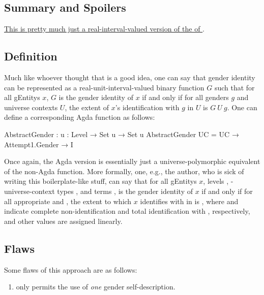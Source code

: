\documentclass{article}
\theoremstyle{remark}
\newcommand{\summaryLink}[2]{\hyperref[#1]{#2}}
\begin{document}
\subsection{Summary and Spoilers}
\summaryLink{sec:gender6definition}{This \AgdaFunction{AbstractGender} is pretty much just a real-interval-valued version of the \AgdaFunction{AbstractGender} of \fref{sec:gender5}}.

\subsection{Definition}\label{sec:gender6definition}
Much like whoever thought that  is a good idea, one can say that gender identity can be represented as a real-unit-interval-valued binary function \(G\) such that for all \glspl{gEntity} \(x\), \(G\) is the gender identity of \(x\) if and only if for all genders \(g\) and universe contexts \(U\), the extent of \(x\)'s identification with \(g\) in \(U\) is \(G\ U\ g\).  One can define a corresponding Agda function  as follows:

\begin{code}
  AbstractGender : {u : Level} → Set u → Set u
  AbstractGender UC = UC → Attempt1.Gender → I
\end{code}

Once again, the Agda version is essentially just a universe-polymorphic equivalent of the non-Agda function.  More formally, one, e.g., the author, who is sick of writing this boilerplate-like stuff, can say that for all \glspl{gEntity} \(x\), levels , -universe-context types , and   terms ,  is the gender identity of \(x\) if and only if for all appropriate  and , the extent to which \(x\) identifies with  in  is   , where  and  indicate complete non-identification and total identification with , respectively, and other  values are assigned linearly.

\subsection{Flaws}\label{sec:gender6flaws}
Some flaws of this approach are as follows:

\begin{enumerate}
  \item {} only permits the use of \emph{one} gender self-description.\label{enum:gender6flawsMultiDesc}
\end{enumerate}
\end{document}
